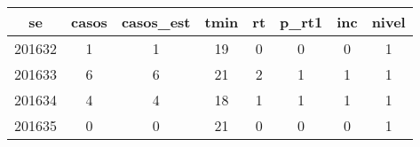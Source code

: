 \begin{tabular}{c|ccccccc}
  \hline
se & casos & casos\_est & tmin & rt & p\_rt1 & inc & nivel \\ 
  \hline
201632 & 1 & 1 & 19 & 0 & 0 & 0 & 1 \\ 
  201633 & 6 & 6 & 21 & 2 & 1 & 1 & 1 \\ 
  201634 & 4 & 4 & 18 & 1 & 1 & 1 & 1 \\ 
  201635 & 0 & 0 & 21 & 0 & 0 & 0 & 1 \\ 
   \hline
\end{tabular}

